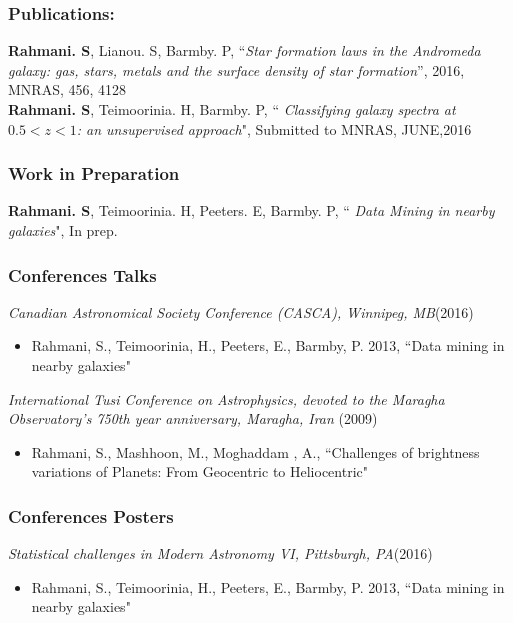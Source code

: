 \documentclass[12pt,twoside]{report}
\numberwithin{figure}{chapter}
\begin{document}
\subsubsection*{Publications:}
 \textbf{Rahmani. S}, Lianou. S, Barmby. P, ``{\em Star formation laws in the Andromeda galaxy: gas, stars, metals and the surface density of star formation}'', 2016, MNRAS, 456, 4128\\
\textbf{Rahmani. S}, Teimoorinia. H, Barmby. P, `` {\em Classifying galaxy spectra at $0.5<z<1$: an unsupervised approach}", Submitted to MNRAS, JUNE,2016\\

\subsubsection*{Work in Preparation}
 \textbf{Rahmani. S}, Teimoorinia. H, Peeters. E, Barmby. P, `` {\em Data Mining in nearby galaxies}", In prep.\\

\subsubsection*{Conferences Talks}

{\sl Canadian Astronomical Society Conference (CASCA), Winnipeg, MB}\hfill(2016)
\begin{itemize} 
\item Rahmani, S., Teimoorinia, H., Peeters, E.,  Barmby, P. 2013, ``Data mining in nearby galaxies" 
\end{itemize}

{\sl International Tusi Conference on Astrophysics, devoted to the Maragha Observatory's 750th year
anniversary, Maragha, Iran} \hfill(2009)
\begin{itemize} 
\item Rahmani, S., Mashhoon, M., Moghaddam , A., ``Challenges of brightness variations of Planets: From Geocentric to Heliocentric" 
\end{itemize}
\subsubsection*{Conferences Posters}
{\sl Statistical challenges in Modern Astronomy {\textsc VI}, Pittsburgh, PA}\hfill(2016)
\begin{itemize} 
\item Rahmani, S., Teimoorinia, H., Peeters, E.,  Barmby, P. 2013, ``Data mining in nearby galaxies" 
\end{itemize}
\end{document}
